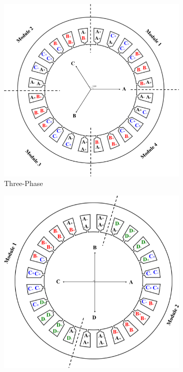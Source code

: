 \documentclass[a4paper,11pt]{article}
\begin{document}
\begin{figure}[ht!]
\begin{subfigure}[b]{0.24\textwidth}
    \centering
    \includegraphics[width=\linewidth]{3ph.png}
    \caption{Three-Phase}
    \label{fig:3ph}    
\end{subfigure}
\begin{subfigure}[b]{0.24\textwidth}
    \centering
    \includegraphics[width=\linewidth]{4ph.png}

\end{subfigure}
\end{figure}
\end{document}

